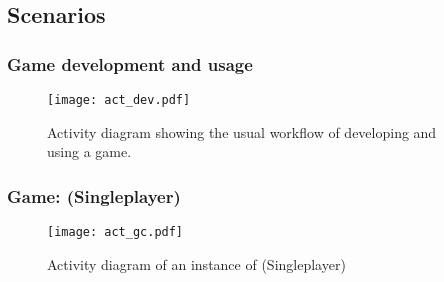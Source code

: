 \subsection{Scenarios}

\subsubsection{Game development and usage}
\begin{figure}[h!]
	\centering
	\texttt{[image: act\_dev.pdf]}
	\caption{Activity diagram showing the usual workflow of developing and using a game.}
	\label{img:ACTDEV}
\end{figure}
\pagebreak
\subsubsection{Game: {\graphcoloring} (Singleplayer)}
\begin{figure}[h!]
	\centering
	\texttt{[image: act\_gc.pdf]}
	\caption{Activity diagram of an instance of {\graphcoloring} (Singleplayer)}
	\label{img:ACTGC}
\end{figure}